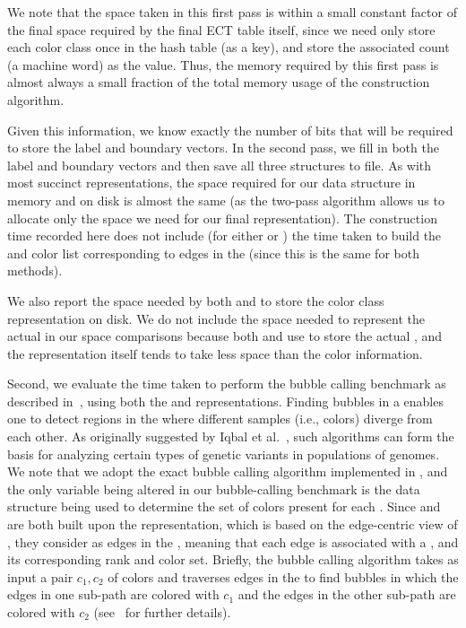 We note that the space taken in this first pass is within a small constant
factor of the final space required by the final ECT table itself, since we need
only store each color class once in the hash table (as a key), and store the
associated count (a machine word) as the value.  Thus, the memory required by
this first pass is almost always a small fraction of the total memory usage 
of the construction algorithm.

Given this information, we know exactly the number of bits that will be required
to store the label and boundary vectors. In the second pass, we fill in both the
label and boundary vectors and then save all three structures to file. As with
most succinct representations, the space required for our data structure in
memory and on disk is almost the same (as the two-pass algorithm allows us to
allocate only the space we need for our final representation). The construction
time recorded here does not include (for either \system or \vari) the time taken
to build the \dbg and color list corresponding to edges in the \dbg (since this
is the same for both methods).

We also report the space needed by both \system and \vari to store the color class
representation on disk. We do not include the space needed to represent the
actual \dbg in our space comparisons because both \system and \vari use \boss
to store the actual \dbg, and the \boss representation itself tends to take less
space than the color information.

Second, we evaluate the time taken to perform the bubble calling benchmark as
described in~\cite{MuggliBoNo17}, using both the \vari and \system
representations. Finding bubbles in a \cdbg enables one to detect regions in the
\dbg where different samples (i.e., colors) diverge from each other. As
originally suggested by Iqbal et al.~\cite{Iqbal2012Novo}, such algorithms can
form the basis for analyzing certain types of genetic variants in populations of
genomes. We note that we adopt the exact bubble calling algorithm implemented in
\vari, and the only variable being altered in our bubble-calling benchmark is
the data structure being used to determine the set of colors present for each
\kmer. Since \vari and \system are both built upon the \boss representation,
which is based on the edge-centric view of \dbg, they consider \kmers as edges
in the \dbg, meaning that each edge is associated with a \kmer, and its
corresponding rank and color set. Briefly, the bubble calling algorithm takes as
input a pair $c_1,c_2$ of colors and traverses edges in the \dbg to find bubbles
in which the edges in one sub-path are colored with $c_1$ and the edges in the
other sub-path are colored with $c_2$ (see~\cite{MuggliBoNo17} for further
details).

